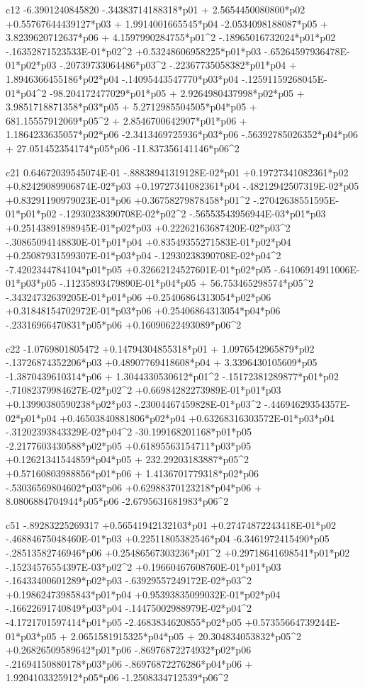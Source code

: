  c12
  -6.3901240845820  -.34383714188318*p01 + 2.5654450080800*p02 +0.55767644439127*p03 + 1.9914001665545*p04  -2.0534098188087*p05 + 3.8239620712637*p06 + 4.1597990284755*p01^2  -.18965016732024*p01*p02  -.16352871523533E-01*p02^2 +0.53248606958225*p01*p03  -.65264597936478E-01*p02*p03  -.20739733064486*p03^2  -.22367735058382*p01*p04 + 1.8946366455186*p02*p04  -.14095443547770*p03*p04  -.12591159268045E-01*p04^2  -98.204172477029*p01*p05 + 2.9264980437998*p02*p05 + 3.9851718871358*p03*p05 + 5.2712985504505*p04*p05 + 681.15557912069*p05^2 + 2.8546700642907*p01*p06 + 1.1864233635057*p02*p06  -2.3413469725936*p03*p06  -.56392785026352*p04*p06 + 27.051452354174*p05*p06  -11.837356141146*p06^2 
  
 c21
  0.64672039545074E-01  -.88838941319128E-02*p01 +0.19727341082361*p02 +0.82429089906874E-02*p03 +0.19727341082361*p04  -.48212942507319E-02*p05 +0.83291190979023E-01*p06 +0.36758279878458*p01^2  -.27042638551595E-01*p01*p02  -.12930238390708E-02*p02^2  -.56553543956944E-03*p01*p03 +0.25143891898945E-01*p02*p03 +0.22262163687420E-02*p03^2  -.30865094148830E-01*p01*p04 +0.83549355271583E-01*p02*p04 +0.25087931599307E-01*p03*p04  -.12930238390708E-02*p04^2  -7.4202344784104*p01*p05 +0.32662124527601E-01*p02*p05  -.64106914911006E-01*p03*p05  -.11235893479890E-01*p04*p05 + 56.753465298574*p05^2  -.34324732639205E-01*p01*p06 +0.25406864313054*p02*p06 +0.31848154702972E-01*p03*p06 +0.25406864313054*p04*p06  -.23316966470831*p05*p06 +0.16090622493089*p06^2 
  
 c22
  -1.0769801805472 +0.14794304855318*p01 + 1.0976542965879*p02  -.13726874352206*p03 +0.48907769418608*p04 + 3.3396430105609*p05  -1.3870439610314*p06 + 1.3044330530612*p01^2  -.15172381289877*p01*p02  -.71082379984627E-02*p02^2 +0.66984282273989E-01*p01*p03 +0.13990380590238*p02*p03  -.23004467459828E-01*p03^2  -.44694629354357E-02*p01*p04 +0.46503840881806*p02*p04 +0.63268316303572E-01*p03*p04  -.31202393843329E-02*p04^2  -30.199168201168*p01*p05  -2.2177603430588*p02*p05 +0.61895563154711*p03*p05 +0.12621341544859*p04*p05 + 232.29203183887*p05^2 +0.57160803988856*p01*p06 + 1.4136701779318*p02*p06  -.53036569804602*p03*p06 +0.62988370123218*p04*p06 + 8.0806884704944*p05*p06  -2.6795631681983*p06^2 
  
 c51
  -.89283225269317 +0.56541942132103*p01 +0.27474872243418E-01*p02  -.46884675048460E-01*p03 +0.22511805382546*p04  -6.3461972415490*p05  -.28513582746946*p06 +0.25486567303236*p01^2 +0.29718641698541*p01*p02  -.15234576554397E-03*p02^2 +0.19660467608760E-01*p01*p03  -.16433400601289*p02*p03  -.63929557249172E-02*p03^2 +0.19862473985843*p01*p04 +0.95393835099032E-01*p02*p04  -.16622691740849*p03*p04  -.14475002988979E-02*p04^2  -4.1721701597414*p01*p05  -2.4683834620855*p02*p05 +0.57355664739244E-01*p03*p05 + 2.0651581915325*p04*p05 + 20.304834053832*p05^2 +0.26826509589642*p01*p06  -.86976872274932*p02*p06  -.21694150880178*p03*p06  -.86976872276286*p04*p06 + 1.9204103325912*p05*p06  -1.2508334712539*p06^2 
  
